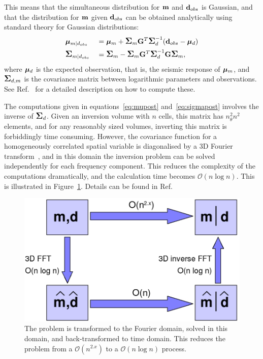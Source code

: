 This means that the simultaneous distribution for $\mathbf{m}$ and
$\mathbf{d}_{obs}$ is Gaussian, and that the distribution for $\mathbf{m}$
given $\mathbf{d}_{obs}$ can be obtained analytically using standard
theory for Gaussian distributions:
%
\begin{alignat}{2}
  &\bm\mu_{m|d_{obs}}    &&=\bm\mu_{m} +\mbox{\large\ensuremath{\boldsymbol{\Sigma}}}_{m}\mathbf{G}^T \mbox{\large\ensuremath{\boldsymbol{\Sigma}}}_{d}^{-1}
                           (\mathbf{d}_{obs}-\bm\mu_{d})     \label{eq:mupost} \\
  &\mbox{\large\ensuremath{\boldsymbol{\Sigma}}}_{m|d_{obs}} &&=\mbox{\large\ensuremath{\boldsymbol{\Sigma}}}_{m} - \mbox{\large\ensuremath{\boldsymbol{\Sigma}}}_{m}\mathbf{G}^T
                           \mbox{\large\ensuremath{\boldsymbol{\Sigma}}}_{d}^{-1}\mathbf{G}\mbox{\large\ensuremath{\boldsymbol{\Sigma}}}_{m},\label{eq:sigmapost}
\end{alignat}
%
where $\bm\mu_{d}$ is the expected observation, that is, the
seismic response of $\bm\mu_m$, and $\mbox{\large\ensuremath{\boldsymbol{\Sigma}}}_{d,m}$ is the
covariance matrix between logarithmic parameters and
observations. See Ref.~\cite{geo68ab1} for a detailed description on
how to compute these.

The computations given in equations~\eqref{eq:mupost}
and~\eqref{eq:sigmapost} involves the inverse of $\mbox{\large\ensuremath{\boldsymbol{\Sigma}}}_{d}$. Given an
inversion volume with $n$ cells, this matrix has $n_\theta^2n^2$
elements, and for any reasonably sized volumes, inverting this matrix
is forbiddingly time consuming. However, the covariance function for a
homogeneously correlated spatial variable is diagonalised by a 3D
Fourier transform~\cite{christakos92}, and in this domain the inversion
problem can be solved independently for each frequency component. This
reduces the complexity of the computations dramatically, and the
calculation time becomes $\mathcal{O}(n\log n)$. This is illustrated
in Figure~\ref{fig:FFT-flowdiagram}. Details can be found in
Ref.~\cite{geo68ab2}
\begin{figure}[H]
  \includegraphics[width=.99\linewidth]{images/FFT_flowdiagram}
  \caption{The problem is transformed to the Fourier domain, solved
  in this domain, and back-transformed to time domain. This reduces
  the problem from a $\mathcal{O}(n^{2.x})$ to a $\mathcal{O}(n\log
  n)$ process.}
  \label{fig:FFT-flowdiagram}
\end{figure}


